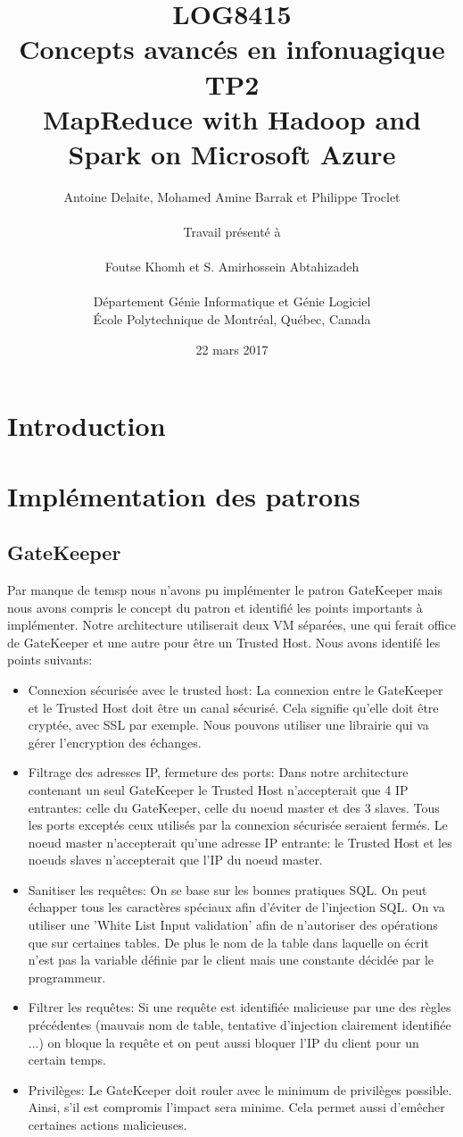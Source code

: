 \documentclass[11pt]{article}
\title{LOG8415 \\ Concepts avanc\'{e}s en infonuagique \\ TP2\\ MapReduce with Hadoop and Spark on Microsoft Azure}
\author{
	Antoine Delaite, Mohamed Amine Barrak et Philippe Troclet \\
		\\
	Travail pr\'{e}sent\'{e} \`a \\
		\\
	Foutse Khomh et S. Amirhossein Abtahizadeh \\
		\\
	D\'{e}partement G\'{e}nie Informatique et G\'{e}nie Logiciel \\
	\'{E}cole Polytechnique de Montr\'{e}al, Qu\'{e}bec, Canada
}
\date{22 mars 2017}
\begin{document}
\maketitle

\section{Introduction}

\section{Implémentation des patrons}
\subsection{GateKeeper}
Par manque de temsp nous n'avons pu implémenter le patron GateKeeper mais nous avons compris le concept du patron et identifié les points importants à implémenter. Notre architecture utiliserait deux VM séparées, une qui ferait office de GateKeeper et une autre pour être un Trusted Host. Nous avons identifé les points suivants:

\begin{itemize}
    \item Connexion sécurisée avec le trusted host: La connexion entre le GateKeeper et le Trusted Host doit être un canal sécurisé. Cela signifie qu'elle doit être cryptée, avec SSL par exemple. Nous pouvons utiliser une librairie qui va gérer l'encryption des échanges.
    \item Filtrage des adresses IP, fermeture des ports: Dans notre architecture contenant un seul GateKeeper le Trusted Host n'accepterait que 4 IP entrantes: celle du GateKeeper, celle du noeud master et des 3 slaves. Tous les ports exceptés ceux utilisés par la connexion sécurisée seraient fermés. Le noeud master n'accepterait qu'une adresse IP entrante: le Trusted Host et les noeuds slaves n'accepterait que l'IP du noeud master.
    \item Sanitiser les requêtes: On se base sur les bonnes pratiques SQL. On peut échapper tous les caractères spéciaux afin d'éviter de l'injection SQL. On va utiliser une 'White List Input validation' afin de n'autoriser des opérations que sur certaines tables. De plus le nom de la table dans laquelle on écrit n'est pas la variable définie par le client mais une constante décidée par le programmeur.
    \item Filtrer les requêtes: Si une requête est identifiée malicieuse par une des règles précédentes (mauvais nom de table, tentative d'injection clairement identifiée ...) on bloque la requête et on peut aussi bloquer l'IP du client pour un certain temps.
    \item Privilèges: Le GateKeeper doit rouler avec le minimum de privilèges possible. Ainsi, s'il est compromis l'impact sera minime. Cela permet aussi d'emêcher certaines actions malicieuses.
\end{itemize}
\end{document}
